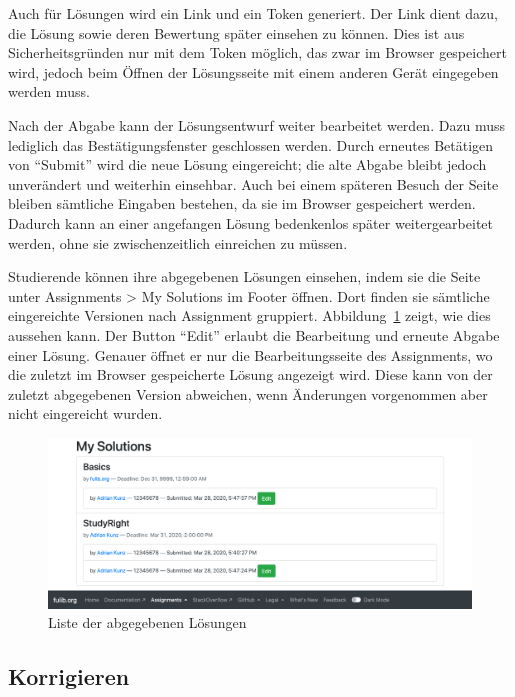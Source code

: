 Auch für Lösungen wird ein Link und ein Token generiert.
Der Link dient dazu, die Lösung sowie deren Bewertung später einsehen zu können.
Dies ist aus Sicherheitsgründen nur mit dem Token möglich, das zwar im Browser gespeichert wird, jedoch beim Öffnen der Lösungsseite mit einem anderen Gerät eingegeben werden muss.

Nach der Abgabe kann der Lösungsentwurf weiter bearbeitet werden.
Dazu muss lediglich das Bestätigungsfenster geschlossen werden.
Durch erneutes Betätigen von ``Submit'' wird die neue Lösung eingereicht;
die alte Abgabe bleibt jedoch unverändert und weiterhin einsehbar.
Auch bei einem späteren Besuch der Seite bleiben sämtliche Eingaben bestehen, da sie im Browser gespeichert werden.
Dadurch kann an einer angefangen Lösung bedenkenlos später weitergearbeitet werden, ohne sie zwischenzeitlich einreichen zu müssen.

Studierende können ihre abgegebenen Lösungen einsehen, indem sie die Seite unter Assignments > My Solutions im Footer öffnen.
Dort finden sie sämtliche eingereichte Versionen nach Assignment gruppiert.
Abbildung~\ref{fig:my-solutions} zeigt, wie dies aussehen kann.
Der Button ``Edit'' erlaubt die Bearbeitung und erneute Abgabe einer Lösung.
Genauer öffnet er nur die Bearbeitungsseite des Assignments, wo die zuletzt im Browser gespeicherte Lösung angezeigt wird.
Diese kann von der zuletzt abgegebenen Version abweichen, wenn Änderungen vorgenommen aber nicht eingereicht wurden.

\begin{figure}
    \centering
    \includegraphics[width=\textwidth]{chapter/fulib.org/img/my-solutions.png}
    \caption{Liste der abgegebenen Lösungen}
    \label{fig:my-solutions}
\end{figure}

\subsection{Korrigieren}\label{subsec:correcting}

